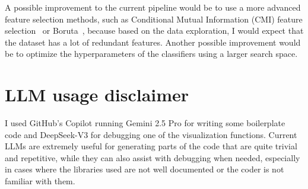 \documentclass[12pt]{article}
\begin{document}
A possible improvement to the current pipeline would be to use a more advanced
feature selection methods, such as Conditional Mutual Information (CMI)
feature selection~\cite{sym11070858} or Boruta~\cite{JSSv036i11}, because
based on the data exploration, I would expect that the dataset has a lot of
redundant features. Another possible improvement would be to optimize the
hyperparameters of the classifiers using a larger search space.


\section{LLM usage disclaimer}
I used GitHub's Copilot running Gemini 2.5 Pro for writing some boilerplate
code and DeepSeek-V3 for debugging one of the visualization functions. Current
LLMs are extremely useful for generating parts of the code that are quite
trivial and repetitive, while they can also assist with debugging when needed,
especially in cases where the libraries used are not well documented or the
coder is not familiar with them.




\end{document}
